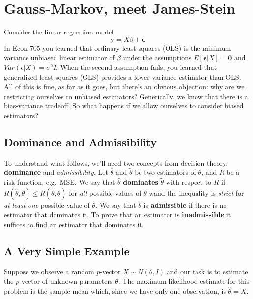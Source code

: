 \section{Gauss-Markov, meet James-Stein}
Consider the linear regression model
	$$\mathbf{y} = X\beta + \boldsymbol{\epsilon}$$
In Econ 705 you learned that ordinary least squares (OLS) is the minimum variance unbiased linear estimator of $\beta$ under the assumptions $E[\boldsymbol{\epsilon}|X] = \mathbf{0}$ and $Var(\epsilon|X) = \sigma^2 I$.
When the second assumption fails, you learned that generalized least squares (GLS) provides a lower variance estimator than OLS.
All of this is fine, as far as it goes, but there's an obvious objection: why are we restricting ourselves to unbiased estimators? Generically, we know that there is a bias-variance tradeoff.
So what happens if we allow ourselves to consider biased estimators? 



\subsection{Dominance and Admissibility}
To understand what follows, we'll need two concepts from decision theory: \textbf{dominance} and \emph{admissibility}. 
Let $\widehat{\theta}$ and $\widetilde{\theta}$ be two estimators of $\theta$, and $R$ be a risk function, e.g.\ MSE.
We say that $\widehat{\theta}$ \textbf{dominates} $\widetilde{\theta}$ with respect to $R$ if $R(\widehat{\theta},\theta) \leq R(\widetilde{\theta},\theta)$ for \emph{all} possible values of $\theta$ wand the inequality is \emph{strict} for \emph{at least one} possible value of $\theta$.
We say that $\widehat{\theta}$ is \textbf{admissible} if there is no estimator that dominates it.
To prove that an estimator is \textbf{inadmissible} it suffices to find an estimator that dominates it.


\subsection{A Very Simple Example}
Suppose we observe a random $p$-vector $X \sim N\left( \theta, I \right)$ and our task is to estimate the $p$-vector of unknown parameters $\theta$.
The maximum likelihood estimate for this problem is the sample mean which, since we have only one observation, is $\hat{\theta} = X$.

